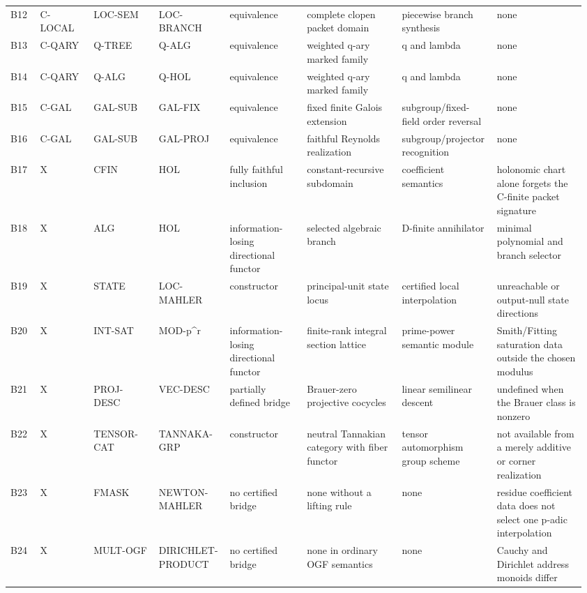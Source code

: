 \begin{landscape}
\begin{longtable}{@{}L{0.055\linewidth}L{0.09\linewidth}L{0.11\linewidth}L{0.11\linewidth}L{0.13\linewidth}L{0.16\linewidth}L{0.15\linewidth}L{0.15\linewidth}@{}}
B12 & C-LOCAL & LOC-SEM & LOC-BRANCH & equivalence & complete clopen packet domain & piecewise branch synthesis & none\\[2pt]
B13 & C-QARY & Q-TREE & Q-ALG & equivalence & weighted q-ary marked family & q and lambda & none\\[2pt]
B14 & C-QARY & Q-ALG & Q-HOL & equivalence & weighted q-ary marked family & q and lambda & none\\[2pt]
B15 & C-GAL & GAL-SUB & GAL-FIX & equivalence & fixed finite Galois extension & subgroup/fixed-field order reversal & none\\[2pt]
B16 & C-GAL & GAL-SUB & GAL-PROJ & equivalence & faithful Reynolds realization & subgroup/projector recognition & none\\[2pt]
B17 & X & CFIN & HOL & fully faithful inclusion & constant-recursive subdomain & coefficient semantics & holonomic chart alone forgets the C-finite packet signature\\[2pt]
B18 & X & ALG & HOL & information-losing directional functor & selected algebraic branch & D-finite annihilator & minimal polynomial and branch selector\\[2pt]
B19 & X & STATE & LOC-MAHLER & constructor & principal-unit state locus & certified local interpolation & unreachable or output-null state directions\\[2pt]
B20 & X & INT-SAT & MOD-p\textasciicircum{}r & information-losing directional functor & finite-rank integral section lattice & prime-power semantic module & Smith/Fitting saturation data outside the chosen modulus\\[2pt]
B21 & X & PROJ-DESC & VEC-DESC & partially defined bridge & Brauer-zero projective cocycles & linear semilinear descent & undefined when the Brauer class is nonzero\\[2pt]
B22 & X & TENSOR-CAT & TANNAKA-GRP & constructor & neutral Tannakian category with fiber functor & tensor automorphism group scheme & not available from a merely additive or corner realization\\[2pt]
B23 & X & FMASK & NEWTON-MAHLER & no certified bridge & none without a lifting rule & none & residue coefficient data does not select one p-adic interpolation\\[2pt]
B24 & X & MULT-OGF & DIRICHLET-PRODUCT & no certified bridge & none in ordinary OGF semantics & none & Cauchy and Dirichlet address monoids differ\\[2pt]
\end{longtable}
\end{landscape}
